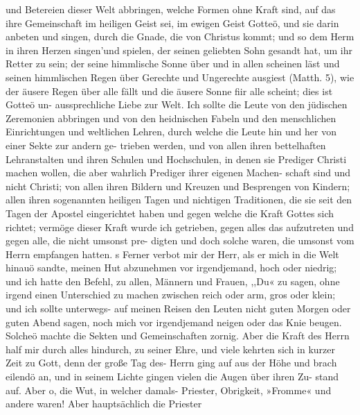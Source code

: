 und Betereien dieser Welt abbringen, welche Formen ohne Kraft
sind, auf das ihre Gemeinschaft im heiligen Geist sei, im ewigen
Geist Gotteö, und sie darin anbeten und singen, durch die Gnade,
die von Christus kommt; und so dem Herm in ihren Herzen
singen’und spielen, der seinen geliebten Sohn gesandt hat, um
ihr Retter zu sein; der seine himmlische Sonne über und in allen
scheinen läst und seinen himmlischen Regen über Gerechte und
Ungerechte ausgiest (Matth. 5), wie der äusere Regen über alle
fällt und die äusere Sonne fiir alle scheint; dies ist Gotteö un-
aussprechliche Liebe zur Welt. Ich sollte die Leute von den
jüdischen Zeremonien abbringen und von den heidnischen Fabeln
und den menschlichen Einrichtungen und weltlichen Lehren, durch
welche die Leute hin und her von einer Sekte zur andern ge-
trieben werden, und von allen ihren bettelhaften Lehranstalten
und ihren Schulen und Hochschulen, in denen sie Prediger Christi
machen wollen, die aber wahrlich Prediger ihrer eigenen Machen-
schaft sind und nicht Christi; von allen ihren Bildern und Kreuzen
und Besprengen von Kindern; allen ihren sogenannten heiligen
Tagen und nichtigen Traditionen, die sie seit den Tagen der
Apostel eingerichtet haben und gegen welche die Kraft Gottes
sich richtet; vermöge dieser Kraft wurde ich getrieben, gegen
alles das aufzutreten und gegen alle, die nicht umsonst pre-
digten und doch solche waren, die umsonst vom Herrn empfangen
hatten. s
Ferner verbot mir der Herr, als er mich in die Welt hinauö
sandte, meinen Hut abzunehmen vor irgendjemand, hoch oder
niedrig; und ich hatte den Befehl, zu allen, Männern und Frauen,
,,Du« zu sagen, ohne irgend einen Unterschied zu machen zwischen
reich oder arm, gros oder klein; und ich sollte unterwegs- auf
meinen Reisen den Leuten nicht guten Morgen oder guten Abend
sagen, noch mich vor irgendjemand neigen oder das Knie beugen.
Solcheö machte die Sekten und Gemeinschaften zornig. Aber die
Kraft des Herrn half mir durch alles hindurch, zu seiner Ehre,
und viele kehrten sich in kurzer Zeit zu Gott, denn der große
Tag des- Herrn ging auf aus der Höhe und brach eilendö an,
und in seinem Lichte gingen vielen die Augen über ihren Zu-
stand auf.
Aber o, die Wut, in welcher damals- Priester, Obrigkeit,
»Fromme« und andere waren! Aber hauptsächlich die Priester


